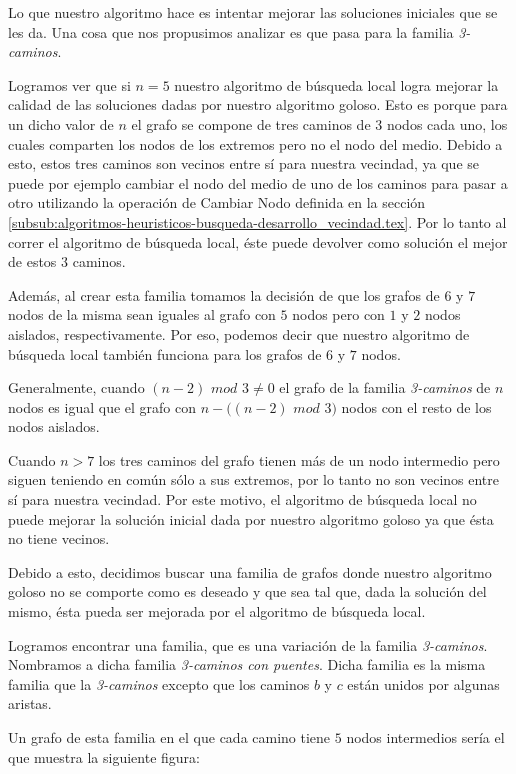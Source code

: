 Lo que nuestro algoritmo hace es intentar mejorar las soluciones iniciales que se les da. Una cosa que nos propusimos analizar es que pasa para la familia \emph{3-caminos}. 

Logramos ver que si $n = 5$ nuestro algoritmo de búsqueda local logra mejorar la calidad de las soluciones dadas por nuestro algoritmo goloso. Esto es porque para un dicho valor de $n$ el grafo se compone de tres caminos de $3$ nodos cada uno, los cuales comparten los nodos de los extremos pero no el nodo del medio. Debido a esto, estos tres caminos son vecinos entre sí para nuestra vecindad, ya que se puede por ejemplo cambiar el nodo del medio de uno de los caminos para pasar a otro utilizando la operación de Cambiar Nodo definida en la sección \ref{subsub:algoritmos-heuristicos-busqueda-desarrollo_vecindad.tex}. Por lo tanto al correr el algoritmo de búsqueda local, éste puede devolver como solución el mejor de estos $3$ caminos.

Además, al crear esta familia tomamos la decisión de que los grafos de $6$ y $7$ nodos de la misma sean iguales al grafo con $5$ nodos pero con $1$ y $2$ nodos aislados, respectivamente. Por eso, podemos decir que nuestro algoritmo de búsqueda local también funciona para los grafos de $6$ y $7$ nodos.

Generalmente, cuando $(n - 2)$ $mod$ $3 \neq 0$ el grafo de la familia \emph{3-caminos} de $n$ nodos es igual que el grafo con $n - ((n-2)$ $mod$ $3)$ nodos con el resto de los nodos aislados.

Cuando $n > 7$ los tres caminos del grafo tienen más de un nodo intermedio pero siguen teniendo en común sólo a sus extremos, por lo tanto no son vecinos entre sí para nuestra vecindad. Por este motivo, el algoritmo de búsqueda local no puede mejorar la solución inicial dada por nuestro algoritmo goloso ya que ésta no tiene vecinos.

Debido a esto, decidimos buscar una familia de grafos donde nuestro algoritmo goloso no se comporte como es deseado y que sea tal que, dada la solución del mismo, ésta pueda ser mejorada por el algoritmo de búsqueda local.

Logramos encontrar una familia, que es una variación de la familia \emph{3-caminos}. Nombramos a dicha familia \emph{3-caminos con puentes}. Dicha familia es la misma familia que la \emph{3-caminos} excepto que los caminos $b$ y $c$ están unidos por algunas aristas.

Un grafo de esta familia en el que cada camino tiene $5$ nodos intermedios sería el que muestra la siguiente figura:


